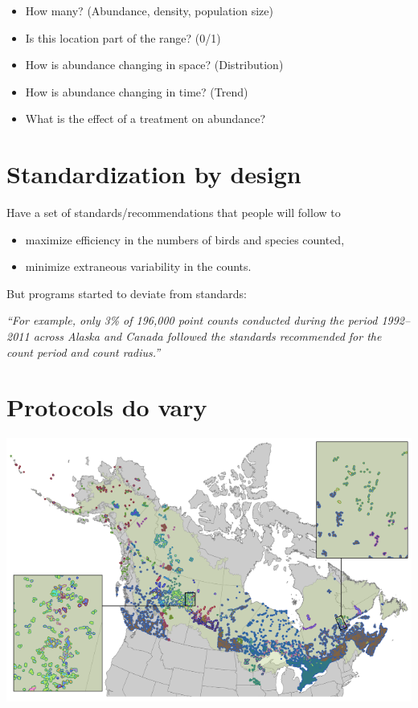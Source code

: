 \documentclass[12pt,]{book}
\providecommand{\tightlist}{%
  \setlength{\itemsep}{0pt}\setlength{\parskip}{0pt}}
\begin{document}
\begin{itemize}
\tightlist
\item
  How many? (Abundance, density, population size)
\item
  Is this location part of the range? (0/1)
\item
  How is abundance changing in space? (Distribution)
\item
  How is abundance changing in time? (Trend)
\item
  What is the effect of a treatment on abundance?
\end{itemize}

\hypertarget{standardization-by-design}{%
\section{Standardization by design}\label{standardization-by-design}}

Have a set of standards/recommendations that people will follow to

\begin{itemize}
\tightlist
\item
  maximize efficiency in the numbers of birds and species counted,
\item
  minimize extraneous variability in the counts.
\end{itemize}

But programs started to deviate from standards:

\emph{``For example, only 3\% of 196,000 point counts conducted during the period
1992--2011 across Alaska and Canada followed the standards recommended for the count period and count radius.''}

\hypertarget{protocols-do-vary}{%
\section{Protocols do vary}\label{protocols-do-vary}}

\includegraphics[width=9.43in]{./images/barker-2015-fig-2}
\end{document}
